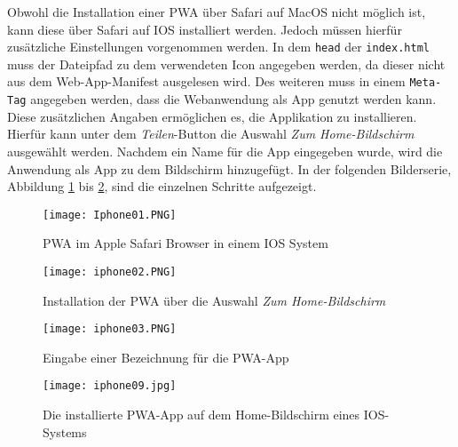 Obwohl die Installation einer PWA über Safari auf MacOS nicht möglich ist, kann diese über Safari auf IOS installiert werden. Jedoch müssen hierfür zusätzliche Einstellungen vorgenommen werden. In dem \texttt{head} der \texttt{index.html} muss der Dateipfad zu dem verwendeten Icon angegeben werden, da dieser nicht aus dem Web-App-Manifest ausgelesen wird. 
Des weiteren muss in einem \texttt{Meta-Tag} angegeben werden, dass die Webanwendung als App genutzt werden kann. Diese zusätzlichen Angaben ermöglichen es, die Applikation zu installieren. 
Hierfür kann unter dem \textit{Teilen}-Button die Auswahl \textit{Zum Home-Bildschirm} ausgewählt werden. Nachdem ein Name für die App eingegeben wurde, wird die Anwendung als App zu dem Bildschirm hinzugefügt. In der folgenden Bilderserie, Abbildung \ref{img:iphone01} bis \ref{img:iphone0n}, sind die einzelnen Schritte aufgezeigt. 

\begin{figure}[!htb]
    \begin{minipage}[b]{.4\linewidth} %
       \texttt{[image: Iphone01.PNG]}
       \caption{PWA im Apple Safari Browser in einem IOS System}
       \label{img:iphone01}
    \end{minipage}
    \hspace{.1\linewidth}%
    \begin{minipage}[b]{.4\linewidth} %
       \texttt{[image: iphone02.PNG]}
       \caption{Installation der PWA über die Auswahl \textit{Zum Home-Bildschirm}}
    \end{minipage}
 \end{figure}

 \begin{figure}[!htb]
    \begin{minipage}[b]{.4\linewidth} %
       \texttt{[image: iphone03.PNG]}
       \caption{Eingabe einer Bezeichnung für die PWA-App}
    \end{minipage}
    \hspace{.1\linewidth}%
    \begin{minipage}[b]{.4\linewidth} %
       \texttt{[image: iphone09.jpg]}
       \caption{Die installierte PWA-App auf dem Home-Bildschirm eines IOS-Systems }
       \label{img:iphone0n}
    \end{minipage}
 \end{figure}


